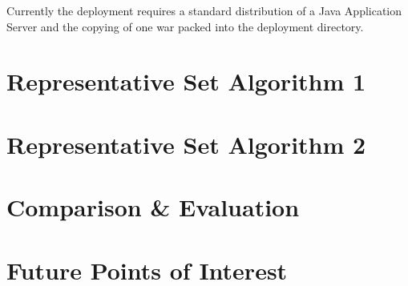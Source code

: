 Currently the deployment requires a standard distribution of a Java Application Server and the copying of one war packed into the deployment directory.

\section{Representative Set Algorithm 1}

\section{Representative Set Algorithm 2}

\section{Comparison \& Evaluation}

\section{Future Points of Interest}
